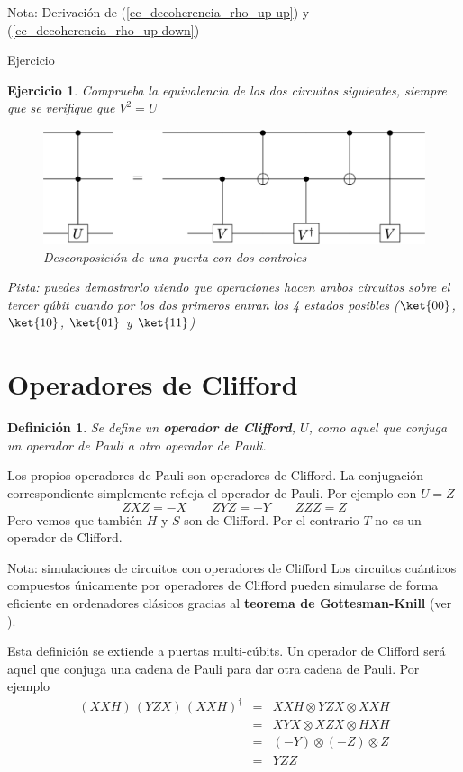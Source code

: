 \documentclass[a4paper,11pt]{book} %
\newtheorem{definicion_contador}{Definición}
\newcommand{\Definicion}[1]{
		\begin{mybox_gray2}{}
			\begin{definicion_contador}
				 #1 
			\end{definicion_contador} 
		\end{mybox_gray2}
	}
\newtheorem{ejercicio_contador}{Ejercicio}
\newcommand{\Ejercicio}[1]{
		\begin{mybox_gray}{Ejercicio} 
			\begin{ejercicio_contador}
				 #1 
			\end{ejercicio_contador} 
		\end{mybox_gray}
	}
\numberwithin{equation}{chapter}
\begin{document}
\begin{mybox_blue}{Nota: Derivación de (\ref{ec_decoherencia_rho_up-up}) y  (\ref{ec_decoherencia_rho_up-down})}
	\Ejercicio{Comprueba la equivalencia de los dos circuitos siguientes, siempre que se verifique que $V^2 = U$
		\begin{figure}[H]
		\centering 
		\includegraphics[width=0.60\linewidth]{Figuras/Fig_elementos_CCUdecomposition}
		\caption{Desconposición de una puerta con dos controles}
		\label{Fig_elementos_CCUdecomposition}
		\end{figure}
	Pista: puedes demostrarlo viendo que operaciones hacen ambos circuitos sobre el tercer qúbit cuando por los dos
	primeros entran los 4 estados posibles ($\ket{00}$, $\ket{10}$, $\ket{01}$ y $\ket{11}$)
	}		
	
    \section{Operadores de Clifford}

	\Definicion{
	Se define un \textbf{operador de Clifford}, $U$, como aquel que conjuga un operador de Pauli a otro operador de Pauli.
	}
	
	Los propios operadores de Pauli son operadores de Clifford.  La conjugación correspondiente simplemente refleja el operador de Pauli. Por ejemplo con $U=Z$
	$$
	ZXZ = -X~~~~~~~~~ZYZ = -Y ~~~~~~~~~ZZZ = Z 
	$$
Pero vemos que también $H$ y $S$ son de Clifford. Por el contrario $T$ no es un operador de Clifford.

	\begin{mybox_blue}{Nota: simulaciones de circuitos con operadores de Clifford}
	Los circuitos cuánticos compuestos únicamente por operadores de Clifford pueden simularse de forma eficiente en ordenadores
	clásicos gracias al \textbf{teorema de Gottesman-Knill} (ver \cite{Gottesman-Knill}).
	\end{mybox_blue}

Esta definición se extiende a puertas multi-cúbits. Un operador de Clifford será aquel que conjuga una cadena de Pauli para dar otra cadena de Pauli. Por ejemplo
	\begin{eqnarray*}
	(XXH) \, (YZX) \,  (XXH)^\dagger &=& XXH \otimes YZX \otimes XXH \\ 
	&=& XYX \otimes  XZX \otimes HXH \\ 
	&=& (-Y)\otimes (-Z) \otimes Z \\ 
	&=& YZZ
	\end{eqnarray*}


\end{mybox_blue}
\end{document}
